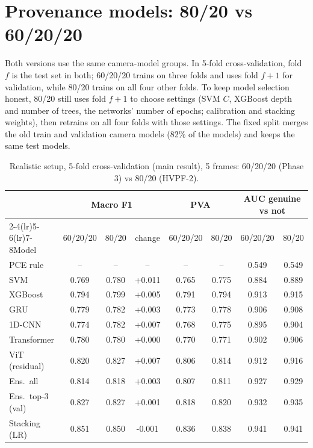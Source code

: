 \documentclass[11pt,a4paper]{article}
\begin{document}
\section{Provenance models: 80/20 vs 60/20/20}
Both versions use the same camera-model groups. In 5-fold cross-validation, fold $f$ is the test set in both; 60/20/20 trains on three folds and uses fold $f{+}1$ for validation, while 80/20 trains on all four other folds. To keep model selection honest, 80/20 still uses fold $f{+}1$ to choose settings (SVM $C$, XGBoost depth and number of trees, the networks' number of epochs; calibration and stacking weights), then retrains on all four folds with those settings. The fixed split merges the old train and validation camera models (82\% of the models) and keeps the same test models.
\begin{table}[H]\centering\small\caption{Realistic setup, 5-fold cross-validation (main result), 5 frames: 60/20/20 (Phase 3) vs 80/20 (HVPF-2).}\begin{tabular}{lccccccc}\toprule & \multicolumn{3}{c}{Macro F1} & \multicolumn{2}{c}{PVA} & \multicolumn{2}{c}{AUC genuine vs not} \\\cmidrule(lr){2-4}\cmidrule(lr){5-6}\cmidrule(lr){7-8}Model & 60/20/20 & 80/20 & change & 60/20/20 & 80/20 & 60/20/20 & 80/20 \\\midrule
PCE rule & -- & -- & -- & -- & -- & 0.549 & 0.549 \\
SVM & 0.769 & 0.780 & +0.011 & 0.765 & 0.775 & 0.884 & 0.889 \\
XGBoost & 0.794 & 0.799 & +0.005 & 0.791 & 0.794 & 0.913 & 0.915 \\
GRU & 0.779 & 0.782 & +0.003 & 0.773 & 0.778 & 0.906 & 0.908 \\
1D-CNN & 0.774 & 0.782 & +0.007 & 0.768 & 0.775 & 0.895 & 0.904 \\
Transformer & 0.780 & 0.780 & +0.000 & 0.770 & 0.771 & 0.902 & 0.906 \\
ViT (residual) & 0.820 & 0.827 & +0.007 & 0.806 & 0.814 & 0.912 & 0.916 \\
Ens.\ all & 0.814 & 0.818 & +0.003 & 0.807 & 0.811 & 0.927 & 0.929 \\
Ens.\ top-3 (val) & 0.827 & 0.827 & +0.001 & 0.818 & 0.820 & 0.932 & 0.935 \\
Stacking (LR) & 0.851 & 0.850 & -0.001 & 0.836 & 0.838 & 0.941 & 0.941 \\
\bottomrule\end{tabular}\end{table}
\end{document}
